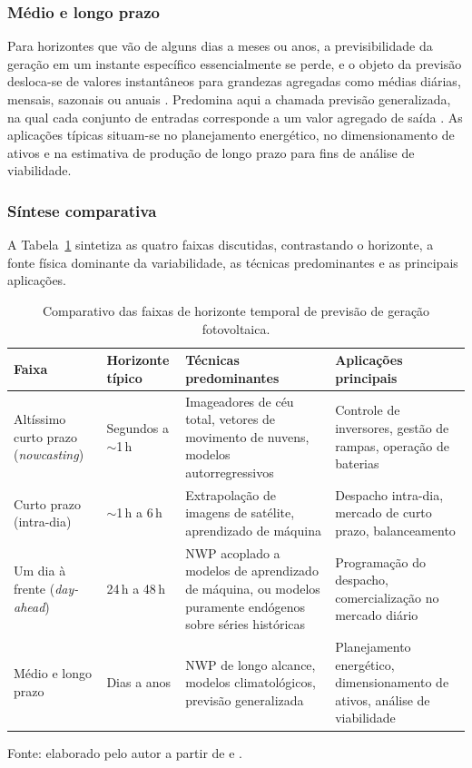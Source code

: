 \subsubsection*{Médio e longo prazo}

Para horizontes que vão de alguns dias a meses ou anos, a previsibilidade da geração em um
instante específico essencialmente se perde, e o objeto da previsão desloca-se de valores
instantâneos para grandezas agregadas como médias diárias, mensais, sazonais ou anuais
\cite{Tian2023}. Predomina aqui a chamada previsão generalizada, na qual cada
conjunto de entradas corresponde a um valor agregado de saída \cite{Tian2023}. As
aplicações típicas situam-se no planejamento energético, no dimensionamento de ativos e na
estimativa de produção de longo prazo para fins de análise de viabilidade.

\subsubsection*{Síntese comparativa}

A Tabela~\ref{tab:horizontes} sintetiza as quatro faixas discutidas, contrastando o
horizonte, a fonte física dominante da variabilidade, as técnicas predominantes e as
principais aplicações.

\begin{table}[htb]
    \centering
    \caption{Comparativo das faixas de horizonte temporal de previsão de geração fotovoltaica.}
    \label{tab:horizontes}
    \begin{tabular}{p{2.4cm} p{2.0cm} p{3.4cm} p{3.2cm}}
        \toprule
        \textbf{Faixa} & \textbf{Horizonte típico} & \textbf{Técnicas predominantes} & \textbf{Aplicações principais} \\
        \midrule
        Altíssimo curto prazo (\emph{nowcasting}) & Segundos a $\sim$1\,h &
        Imageadores de céu total, vetores de movimento de nuvens, modelos autorregressivos &
        Controle de inversores, gestão de rampas, operação de baterias \\
        \addlinespace
        Curto prazo (intra-dia) & $\sim$1\,h a 6\,h &
        Extrapolação de imagens de satélite, aprendizado de máquina &
        Despacho intra-dia, mercado de curto prazo, balanceamento \\
        \addlinespace
        Um dia à frente (\emph{day-ahead}) & 24\,h a 48\,h &
        NWP acoplado a modelos de aprendizado de máquina, ou modelos puramente endógenos sobre séries históricas &
        Programação do despacho, comercialização no mercado diário \\
        \addlinespace
        Médio e longo prazo & Dias a anos &
        NWP de longo alcance, modelos climatológicos, previsão generalizada &
        Planejamento energético, dimensionamento de ativos, análise de viabilidade \\
        \bottomrule
    \end{tabular}
    \begin{flushleft}
    \footnotesize Fonte: elaborado pelo autor a partir de  e .
    \end{flushleft}
\end{table}

